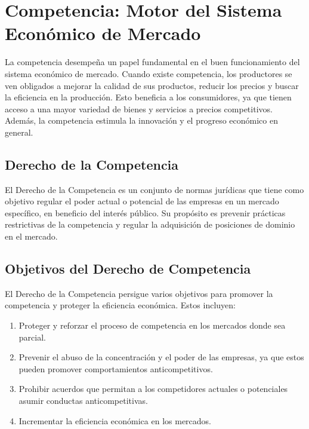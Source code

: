 \documentclass[
  a4paper,
]{article}
\providecommand{\tightlist}{%
  \setlength{\itemsep}{0pt}\setlength{\parskip}{0pt}}\usepackage{longtable,booktabs,array}
\theoremstyle{definition}
\theoremstyle{remark}
\begin{document}
\hypertarget{competencia-motor-del-sistema-econuxf3mico-de-mercado}{%
\section{Competencia: Motor del Sistema Económico de
Mercado}\label{competencia-motor-del-sistema-econuxf3mico-de-mercado}}

La competencia desempeña un papel fundamental en el buen funcionamiento
del sistema económico de mercado. Cuando existe competencia, los
productores se ven obligados a mejorar la calidad de sus productos,
reducir los precios y buscar la eficiencia en la producción. Esto
beneficia a los consumidores, ya que tienen acceso a una mayor variedad
de bienes y servicios a precios competitivos. Además, la competencia
estimula la innovación y el progreso económico en general.

\hypertarget{derecho-de-la-competencia}{%
\subsection{Derecho de la Competencia}\label{derecho-de-la-competencia}}

El Derecho de la Competencia es un conjunto de normas jurídicas que
tiene como objetivo regular el poder actual o potencial de las empresas
en un mercado específico, en beneficio del interés público. Su propósito
es prevenir prácticas restrictivas de la competencia y regular la
adquisición de posiciones de dominio en el mercado.

\hypertarget{objetivos-del-derecho-de-competencia}{%
\subsection{Objetivos del Derecho de
Competencia}\label{objetivos-del-derecho-de-competencia}}

El Derecho de la Competencia persigue varios objetivos para promover la
competencia y proteger la eficiencia económica. Estos incluyen:

\begin{enumerate}
\def\labelenumi{\arabic{enumi}.}
\tightlist
\item
  Proteger y reforzar el proceso de competencia en los mercados donde
  sea parcial.
\item
  Prevenir el abuso de la concentración y el poder de las empresas, ya
  que estos pueden promover comportamientos anticompetitivos.
\item
  Prohibir acuerdos que permitan a los competidores actuales o
  potenciales asumir conductas anticompetitivas.
\item
  Incrementar la eficiencia económica en los mercados.
\end{enumerate}
\end{document}
